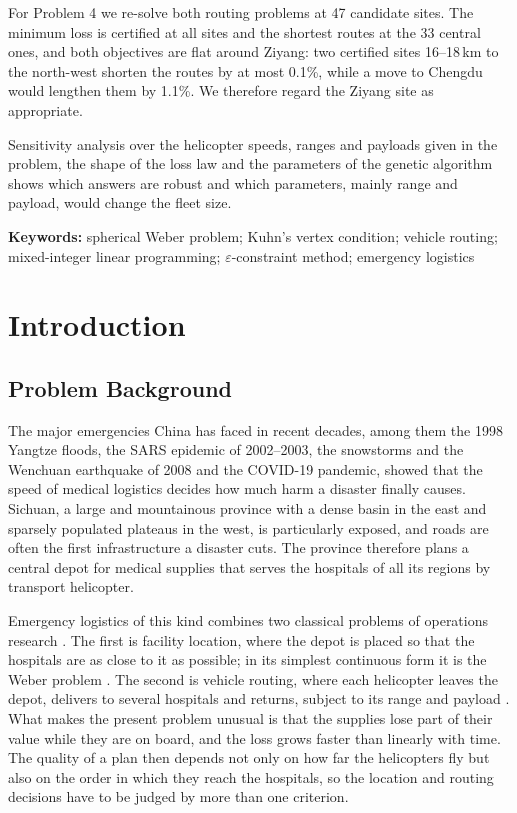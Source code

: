 \documentclass[11pt,a4paper]{article}
\theoremstyle{definition}
\begin{document}
For Problem 4 we re-solve both routing problems at 47 candidate sites.
The minimum loss is certified at all sites and the shortest routes at the 33 central ones, and both objectives are flat around Ziyang: two certified sites 16--18\,km to the north-west shorten the routes by at most 0.1\%, while a move to Chengdu would lengthen them by 1.1\%.
We therefore regard the Ziyang site as appropriate.

Sensitivity analysis over the helicopter speeds, ranges and payloads given in the problem, the shape of the loss law and the parameters of the genetic algorithm shows which answers are robust and which parameters, mainly range and payload, would change the fleet size.

\medskip
\noindent\textbf{Keywords:} spherical Weber problem; Kuhn's vertex condition; vehicle routing; mixed-integer linear programming; $\varepsilon$-constraint method; emergency logistics

\newpage
\begingroup\small
\tableofcontents
\endgroup
\newpage

\section{Introduction}\label{sec:intro}

\subsection{Problem Background}
The major emergencies China has faced in recent decades, among them the 1998 Yangtze floods, the SARS epidemic of 2002--2003, the snowstorms and the Wenchuan earthquake of 2008 and the COVID-19 pandemic, showed that the speed of medical logistics decides how much harm a disaster finally causes.
Sichuan, a large and mountainous province with a dense basin in the east and sparsely populated plateaus in the west, is particularly exposed, and roads are often the first infrastructure a disaster cuts.
The province therefore plans a central depot for medical supplies that serves the hospitals of all its regions by transport helicopter.

Emergency logistics of this kind combines two classical problems of operations research \citep{caunhye2012,ozdamar2004}.
The first is facility location, where the depot is placed so that the hospitals are as close to it as possible; in its simplest continuous form it is the Weber problem \citep{drezner2002}.
The second is vehicle routing, where each helicopter leaves the depot, delivers to several hospitals and returns, subject to its range and payload \citep{toth2014,laporte1992}.
What makes the present problem unusual is that the supplies lose part of their value while they are on board, and the loss grows faster than linearly with time.
The quality of a plan then depends not only on how far the helicopters fly but also on the order in which they reach the hospitals, so the location and routing decisions have to be judged by more than one criterion.
\end{document}
